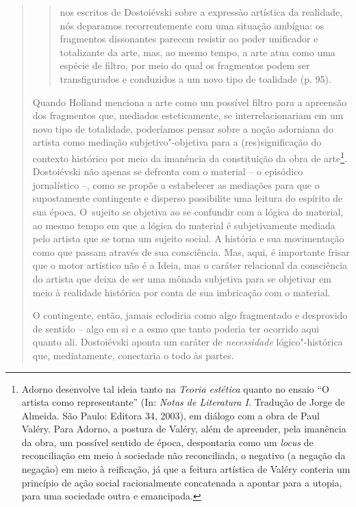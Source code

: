 {\begin{quote}
\begin{quote}
nos escritos de Dostoiévski sobre a expressão artística da realidade,
nós deparamos recorrentemente com uma situação ambígua: os fragmentos
dissonantes parecem resistir ao poder unificador e totalizante da arte,
mas, ao mesmo tempo, a arte atua como uma espécie de filtro, por meio do
qual os fragmentos podem ser transfigurados e conduzidos a um novo tipo
de toalidade (p. 95).
\end{quote}

Quando Holland menciona a arte como um possível filtro para a apreensão
dos fragmentos que, mediados esteticamente, se interrelacionariam em um
novo tipo de totalidade, poderíamos pensar sobre a noção adorniana do
artista como mediação subjetivo"-objetiva para a (res)significação do
contexto histórico por meio da imanência da constituição da obra de
arte\footnote{Adorno desenvolve tal ideia tanto na \emph{Teoria
  estética} quanto no ensaio ``O artista como representante'' (In:
  \emph{Notas de Literatura I}. Tradução de Jorge de Almeida. São Paulo:
  Editora 34, 2003), em diálogo com a obra de Paul Valéry. Para Adorno,
  a postura de Valéry, além de apreender, pela imanência da obra, um
  possível sentido de época, despontaria como um \emph{locus} de
  reconciliação em meio à sociedade não reconciliada, o negativo (a
  negação da negação) em meio à reificação, já que a feitura artística
  de Valéry conteria um princípio de ação social racionalmente
  concatenada a apontar para a utopia, para uma sociedade outra e
  emancipada.}. Dostoiévski não apenas se defronta com o material -- o
episódico jornalístico --, como se propõe a estabelecer as mediações
para que o supostamente contingente e disperso possibilite uma leitura
do espírito de sua época. O~sujeito se objetiva ao se confundir com a
lógica do material, ao mesmo tempo em que a lógica do material é
subjetivamente mediada pelo artista que se torna um sujeito social. A
história e sua movimentação como que passam através de sua consciência.
Mas, aqui, é importante frisar que o motor artístico não é a Ideia, mas
o caráter relacional da consciência do artista que deixa de ser uma
mônada subjetiva para se objetivar em meio à realidade histórica por
conta de sua imbricação com o material.

O contingente, então, jamais eclodiria como algo fragmentado e
desprovido de sentido -- algo em si e a esmo que tanto poderia ter
ocorrido aqui quanto ali. Dostoiévski aponta um caráter de
\emph{necessidade} lógico"-histórica que, mediatamente, conectaria o todo
às partes.


\end{quote}}
